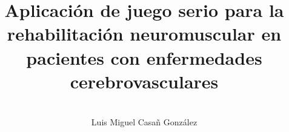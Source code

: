 \documentclass{thesis}
\title{Aplicación de juego serio para la rehabilitación
neuromuscular en pacientes con enfermedades cerebrovasculares}
\author{\\\vspace{0.25cm}Luis Miguel Casañ González}
\begin{document}
    \maketitle
    \thesisgeometry

    
    
    
    
    
    
    

    
\end{document}
